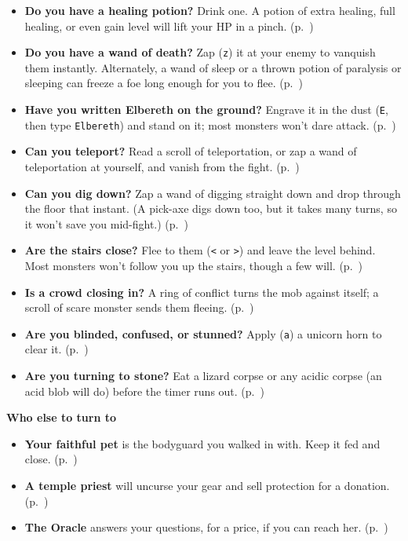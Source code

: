 \documentclass[openany,10pt]{book}
\begin{document}
\begin{center}
\begin{minipage}{0.82\textwidth}
\begin{itemize}[label=\(\square\),leftmargin=1.6em,itemsep=0.35em,topsep=0pt]
\item \textbf{Do you have a healing potion?} Drink one. A potion of extra healing, full healing, or even gain level will lift your HP in a pinch. (p.~\pageref*{potion-healing})
\item \textbf{Do you have a wand of death?} Zap (\texttt{z}) it at your enemy to vanquish them instantly. Alternately, a wand of sleep or a thrown potion of paralysis or sleeping can freeze a foe long enough for you to flee. (p.~\pageref*{wand-death})
\item \textbf{Have you written Elbereth on the ground?} Engrave it in the dust (\texttt{E}, then type \texttt{Elbereth}) and stand on it; most monsters won't dare attack. (p.~\pageref*{elbereth})
\item \textbf{Can you teleport?} Read a scroll of teleportation, or zap a wand of teleportation at yourself, and vanish from the fight. (p.~\pageref*{wand-teleportation})
\item \textbf{Can you dig down?} Zap a wand of digging straight down and drop through the floor that instant. (A pick-axe digs down too, but it takes many turns, so it won't save you mid-fight.) (p.~\pageref*{wand-digging})
\item \textbf{Are the stairs close?} Flee to them (\texttt{<} or \texttt{>}) and leave the level behind. Most monsters won't follow you up the stairs, though a few will. (p.~\pageref*{when-the-fight-goes-badly})
\item \textbf{Is a crowd closing in?} A ring of conflict turns the mob against itself; a scroll of scare monster sends them fleeing. (p.~\pageref*{scroll-scare-monster})
\item \textbf{Are you blinded, confused, or stunned?} Apply (\texttt{a}) a unicorn horn to clear it. (p.~\pageref*{neutralizing-ailments})
\item \textbf{Are you turning to stone?} Eat a lizard corpse or any acidic corpse (an acid blob will do) before the timer runs out. (p.~\pageref*{petrification-stoning})
\end{itemize}

\vspace{0.9em}
\textbf{Who else to turn to}
\begin{itemize}[label=\(\square\),leftmargin=1.6em,itemsep=0.3em,topsep=0.2em]
\item \textbf{Your faithful pet} is the bodyguard you walked in with. Keep it fed and close. (p.~\pageref*{making-friends})
\item \textbf{A temple priest} will uncurse your gear and sell protection for a donation. (p.~\pageref*{donating-to-priests})
\item \textbf{The Oracle} answers your questions, for a price, if you can reach her. (p.~\pageref*{the-oracle})
\end{itemize}


\end{minipage}
\end{center}
\end{document}
